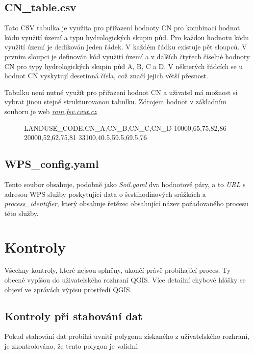 \documentclass[a4paper,oneside,12pt]{book}
\begin{document}
\subsection*{CN\_table.csv} \label{CN_table.csv}
\hspace{10mm} Tato CSV tabulka je využita pro přiřazení hodnoty CN pro kombinaci hodnot kódu využití území a typu hydrologických skupin půd. Pro každou hodnotu kódu využití území je dedikován jeden řádek. V každém řádku existuje pět sloupců. V prvním sloupci je definován kód využití území a v dalších čtyřech číselné hodnoty CN pro typy hydrologických skupin půd A, B, C a D. V některých řádcích se u hodnot CN vyskytují desetinná čísla, což značí jejich větší přesnost.

\hspace{10mm} Tabulku není nutné využít pro přiřazení hodnot CN a uživatel má možnost si vybrat jinou stejně strukturovanou tabulku. Zdrojem hodnot v základním souboru je web \href{http://rain.fsv.cvut.cz}{\textit{rain.fsv.cvut.cz}}


\begin{figure}[H]
\begin{pythoncode}[style=mypython, caption={Ukázka CN\_table.csv},label={kod:CN_table.csv}]
LANDUSE_CODE,CN_A,CN_B,CN_C,CN_D
10000,65,75,82,86
20000,52,62,75,81
33100,40.5,59.5,69.5,76
\end{pythoncode}
\end{figure}

\subsection*{WPS\_config.yaml} \label{WPS_config.yaml}
\hspace{10mm} Tento soubor obsahuje, podobně jako \textit{Soil.yaml} dva hodnotové páry, a to \textit{URL} s adresou WPS služby poskytující data o šestihodinových srážkách a \textit{process\_identifier}, který obsahuje řetězec obsahující název požadovaného procesu této služby.

\section{Kontroly} \label{checks}
\hspace{10mm} Všechny kontroly, které nejsou splněny, ukončí právě probíhající proces. Ty obecné vypíšou do uživatelského rozhraní QGIS. Více detailní chybové hlášky se objeví ve zprávách výpisu prostředí QGIS.

\subsection{Kontroly při stahování dat} \label{download_checks}
\hspace{10mm} Pokud stahování dat probíhá uvnitř polygonu získaného z uživatelského rozhraní, je zkontrolováno, že tento polygon je validní.
\end{document}
